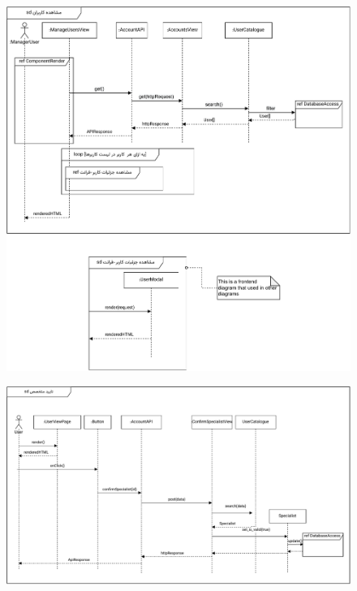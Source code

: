 \eject \pdfpagewidth=12in \pdfpageheight=9in
\begin{figure}[ht!]
	\centering
	\includegraphics[scale=0.8]{figs/design-sequence/3-5.pdf}
\end{figure}
\FloatBarrier
\newpage


\eject \pdfpagewidth=11in \pdfpageheight=7in
\begin{figure}[ht!]
	\centering
	\includegraphics[scale=0.8]{figs/design-sequence/3-6.pdf}
\end{figure}
\FloatBarrier
\newpage


